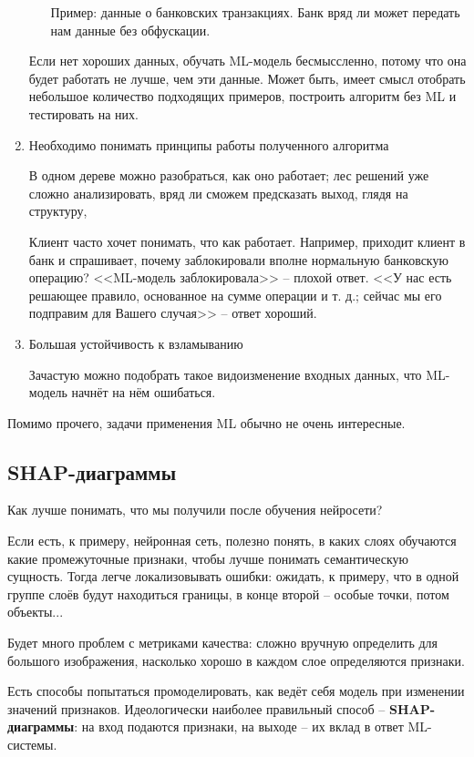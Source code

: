 \documentclass[main.tex]{subfiles}
\begin{document}
\begin{enumerate}[noitemsep]
\begin{enumerate}[noitemsep]
        Пример: данные о банковских транзакциях.
        Банк вряд ли может передать нам данные без обфускации.
    \end{enumerate}
    Если нет хороших данных, обучать ML-модель бесмыссленно, потому что она будет работать не лучше, чем эти данные.
    Может быть, имеет смысл отобрать небольшое количество подходящих примеров, построить алгоритм без ML и тестировать на них.

    \item Необходимо понимать принципы работы полученного алгоритма

    В одном дереве можно разобраться, как оно работает; лес решений уже сложно анализировать, вряд ли сможем предсказать выход, глядя на структуру,

    Клиент часто хочет понимать, что как работает.
    Например, приходит клиент в банк и спрашивает, почему заблокировали вполне нормальную банковскую операцию?
    <<ML-модель заблокировала>> -- плохой ответ.
    <<У нас есть решающее правило, основанное на сумме операции и т. д.; сейчас мы его подправим для Вашего случая>> -- ответ хороший.

    \item Большая устойчивость к взламыванию

    Зачастую можно подобрать такое видоизменение входных данных, что ML-модель начнёт на нём ошибаться.
\end{enumerate}

Помимо прочего, задачи применения ML обычно не очень интересные.

\subsection{SHAP-диаграммы}

Как лучше понимать, что мы получили после обучения нейросети?

Если есть, к примеру, нейронная сеть, полезно понять, в каких слоях обучаются какие промежуточные признаки, чтобы лучше понимать семантическую сущность.
Тогда легче локализовывать ошибки: ожидать, к примеру, что в одной группе слоёв будут находиться границы, в конце второй -- особые точки, потом объекты...


Будет много проблем с метриками качества: сложно вручную определить для большого изображения, насколько хорошо в каждом слое определяются признаки.

Есть способы попытаться промоделировать, как ведёт себя модель при изменении значений признаков.
Идеологически наиболее правильный способ -- \textbf{SHAP-диаграммы}: на вход подаются признаки, на выходе -- их вклад в ответ ML-системы.
\end{document}
